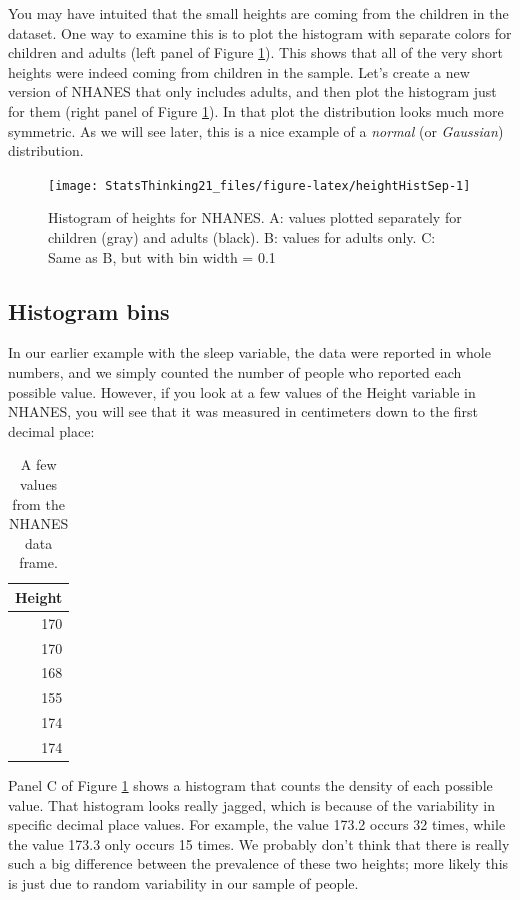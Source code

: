 \documentclass[12pt,]{book}
\theoremstyle{definition}
\theoremstyle{definition}
\theoremstyle{definition}
\theoremstyle{remark}
\begin{document}
You may have intuited that the small heights are coming from the children in the dataset. One way to examine this is to plot the histogram with separate colors for children and adults (left panel of Figure \ref{fig:heightHistSep}). This shows that all of the very short heights were indeed coming from children in the sample. Let's create a new version of NHANES that only includes adults, and then plot the histogram just for them (right panel of Figure \ref{fig:heightHistSep}). In that plot the distribution looks much more symmetric. As we will see later, this is a nice example of a \emph{normal} (or \emph{Gaussian}) distribution.

\begin{figure}
\texttt{[image: StatsThinking21\_files/figure-latex/heightHistSep-1]} \caption{Histogram of heights for NHANES. A: values plotted separately for children (gray) and adults (black).  B: values for adults only. C: Same as B, but with bin width = 0.1}\label{fig:heightHistSep}
\end{figure}

\hypertarget{histogram-bins}{%
\subsection{Histogram bins}\label{histogram-bins}}

In our earlier example with the sleep variable, the data were reported in whole numbers, and we simply counted the number of people who reported each possible value. However, if you look at a few values of the Height variable in NHANES, you will see that it was measured in centimeters down to the first decimal place:

\begin{table}

\caption{\label{tab:unnamed-chunk-10}A few values from the NHANES data frame.}
\centering
\begin{tabular}[t]{r}
\hline
Height\\
\hline
170\\
\hline
170\\
\hline
168\\
\hline
155\\
\hline
174\\
\hline
174\\
\hline
\end{tabular}
\end{table}

Panel C of Figure \ref{fig:heightHistSep} shows a histogram that counts the density of each possible value. That histogram looks really jagged, which is because of the variability in specific decimal place values. For example, the value 173.2 occurs 32 times, while the value 173.3 only occurs 15 times. We probably don't think that there is really such a big difference between the prevalence of these two heights; more likely this is just due to random variability in our sample of people.
\end{document}
